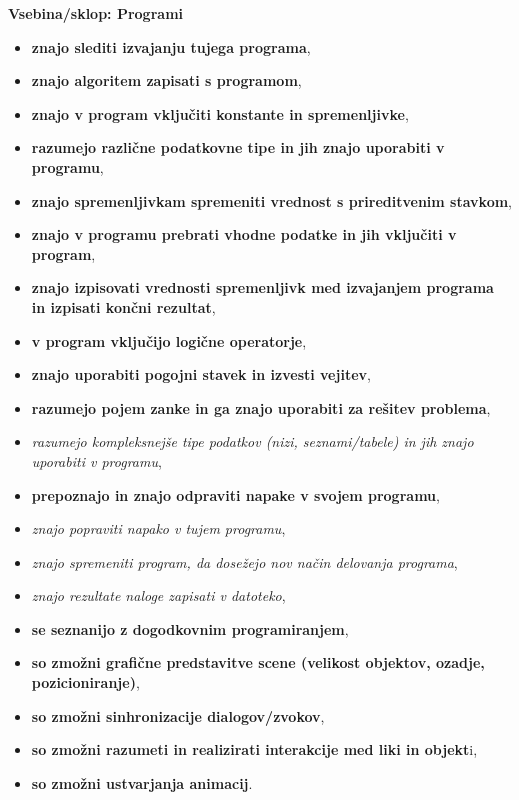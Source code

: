 \textbf{Vsebina/sklop: Programi}
\begin{itemize}
\tightlist
\item \textbf{znajo slediti izvajanju tujega programa},
\item \textbf{znajo algoritem zapisati s programom},
\item \textbf{znajo v program vključiti konstante in spremenljivke},
\item \textbf{ razumejo različne podatkovne tipe in jih znajo uporabiti v
  programu},
\item \textbf{znajo spremenljivkam spremeniti vrednost s prireditvenim
  stavkom},
\item \textbf{znajo v programu prebrati vhodne podatke in jih vključiti v
  program},
\item \textbf{znajo izpisovati vrednosti spremenljivk med izvajanjem programa
  in izpisati končni rezultat},
\item \textbf{v program vključijo logične operatorje},
\item \textbf{znajo uporabiti pogojni stavek in izvesti vejitev},
\item \textbf{razumejo pojem zanke in ga znajo uporabiti za rešitev problema},
\item \emph{razumejo kompleksnejše tipe podatkov (nizi, seznami/tabele) in
  jih znajo uporabiti v programu},
\item \textbf{prepoznajo in znajo odpraviti napake v svojem programu},
\item \emph{znajo popraviti napako v tujem programu},
\item \emph{znajo spremeniti program, da dosežejo nov način delovanja
  programa},
\item \emph{znajo rezultate naloge zapisati v datoteko},
\item \textbf{se seznanijo z dogodkovnim programiranjem},
\item \textbf{so zmožni grafične predstavitve scene (velikost objektov, ozadje, pozicioniranje)},
\item \textbf{so zmožni sinhronizacije dialogov/zvokov},
\item \textbf{so zmožni razumeti in realizirati interakcije med liki in objekt}i,
\item \textbf{ so zmožni ustvarjanja animacij}.
\end{itemize}

